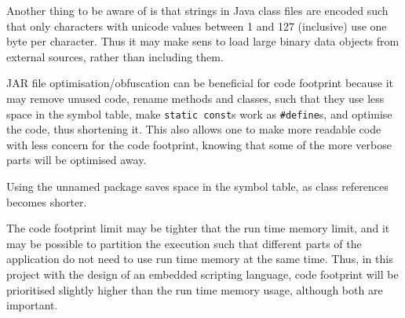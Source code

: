 \documentclass[11pt]{report}
\begin{document}
Another thing to be aware of is that strings in Java class files are encoded such that only characters with unicode values between 1 and 127 (inclusive) use one byte per character. Thus it may make sens to load large binary data objects from external sources, rather than including them.

JAR file optimisation/obfuscation can be beneficial for code footprint because it may
remove unused code,
rename methods and classes, such that they use less space in the symbol table,
make \verb|static const|s work as \verb|#define|s,
 and optimise the code, thus shortening it.
This also allows one to make more readable code with less concern for the code footprint, knowing that some of the more verbose parts will be optimised away.

Using the unnamed package saves space in the symbol table, as class references becomes shorter.

The code footprint limit may be tighter that the run time memory limit, and it may be possible to partition the execution such that different parts of the application do not need to use run time memory at the same time.
Thus, in this project with the design of an embedded scripting language, code footprint will be prioritised slightly higher than the run time memory usage, although both are important.


\end{document}
